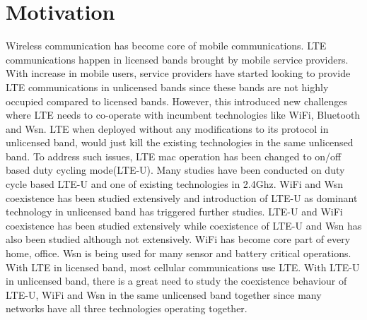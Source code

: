 \documentclass[a4paper]{article}
\begin{document}
\section{Motivation}
	Wireless communication has become core of mobile communications. {LTE} communications happen in licensed bands brought by mobile service providers. With increase in mobile users, service providers have started looking to provide {LTE} communications in unlicensed bands since these bands are not highly occupied compared to licensed bands. However, this introduced new challenges where {LTE} needs to co-operate with  incumbent technologies like {WiFi}, {Bluetooth} and {Wsn}. {LTE} when deployed without any modifications to its protocol in unlicensed band, would just kill the existing technologies in the same unlicensed band. To address such issues, {LTE} mac operation has been changed to on/off based duty cycling mode({LTE-U}). Many studies have been conducted on duty cycle based {LTE-U} and one of existing technologies in 2.4Ghz. {WiFi} and {Wsn} coexistence has been studied extensively and introduction of {LTE-U} as dominant technology in unlicensed band has triggered further studies. {LTE-U} and {WiFi} coexistence has been studied extensively while coexistence of {LTE-U} and {Wsn} has also been studied although not extensively. {WiFi} has become core part of every home, office. {Wsn} is being used for many sensor and battery critical operations. With {LTE} in licensed band, most cellular communications use LTE. With {LTE-U} in unlicensed band, there is a great need to study the coexistence behaviour of {LTE-U}, {WiFi} and {Wsn} in the same unlicensed band together since many networks have all three technologies operating together.
	
\end{document}
